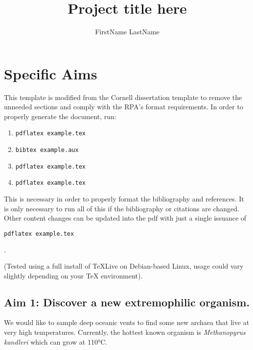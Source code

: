 \documentclass[phd,tocprelim,11pt]{cornell_rpa}
\title {Project title here}
\author {FirstName LastName}
\begin{document}
\maketitle

\normalspacing \setcounter{page}{1} 
\pagestyle{cornell} \addtolength{\parskip}{0.5\baselineskip}

\chapter{Specific Aims}

This template is modified from the Cornell dissertation template\cite{cornell_university_templates_nodate} to remove the unneeded sections and comply with the RPA's format requirements. In order to properly generate the document, run:

\begin{enumerate}
	\item \begin{verbatim}pdflatex example.tex\end{verbatim}
	\item \begin{verbatim}bibtex example.aux\end{verbatim}
	\item \begin{verbatim}pdflatex example.tex\end{verbatim}
	\item \begin{verbatim}pdflatex example.tex\end{verbatim}
\end{enumerate}

This is necessary in order to properly format the bibliography and references. It is only necessary to run all of this if the bibliography or citations are changed. Other content changes can be updated into the pdf with just a single issuance of \begin{verbatim}pdflatex example.tex\end{verbatim}.

(Tested using a full install of TeXLive\cite{tex_users_group_tex_nodate} on Debian-based Linux, usage could vary slightly depending on your TeX environment).

\section{Aim 1: Discover a new extremophilic organism.}
We would like to sample deep oceanic vents to find some new archaea that live at very high temperatures. Currently, the hottest known organism is \emph{Methanopyrus kandleri} which can grow at 110°C\cite{kurr_methanopyrus_1991}.
\end{document}
